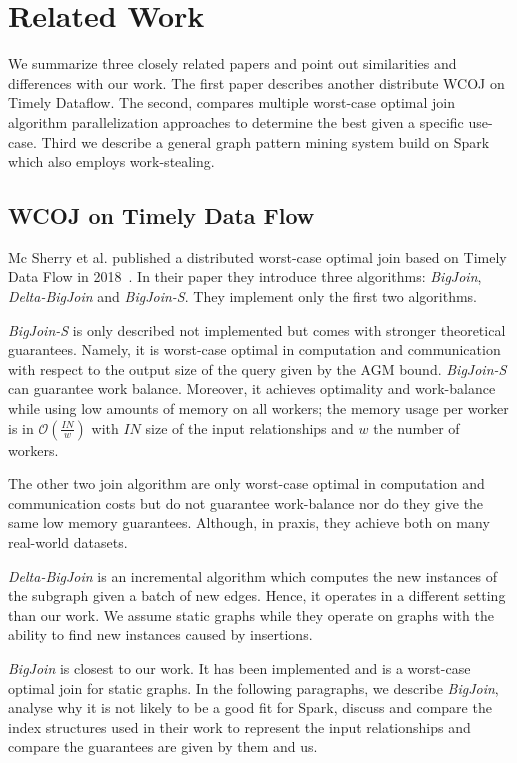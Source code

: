 \section{Related Work} \label{sec:related-work}
We summarize three closely related papers and point out similarities and differences with our
work.
The first paper describes another distribute \textsc{WCOJ} on Timely Dataflow.
The second, compares multiple worst-case optimal join algorithm parallelization
approaches to determine the best given a specific use-case.
Third we describe a general graph pattern mining system build on Spark which also
employs work-stealing.

\subsection{\textsc{WCOJ} on Timely Data Flow}\label{subsec:wcoj-timely-data-flow}

Mc Sherry et al. published a distributed worst-case optimal join based on Timely Data Flow in 2018~\cite{ammar2018distributed,naiad}.
In their paper they introduce three algorithms: \textit{BigJoin}, \textit{Delta-BigJoin} and \textit{BigJoin-S}.
They implement only the first two algorithms.

\textit{BigJoin-S} is only described not implemented but comes with stronger theoretical guarantees.
Namely, it is worst-case optimal in computation and communication with respect to the output size of the query
given by the AGM bound.
\textit{BigJoin-S} can guarantee work balance.
Moreover, it achieves optimality and work-balance while using low amounts of memory on all workers;
the memory usage per worker is in $\mathcal{O} (\frac{IN}{w})$ with $IN$ size of the input relationships and $w$ the number of workers.

The other two join algorithm are only worst-case optimal in computation and communication costs but
do not guarantee work-balance nor do they give the same low memory guarantees.
Although, in praxis, they achieve both on many real-world datasets.

\textit{Delta-BigJoin} is an incremental algorithm which computes the new instances of the subgraph given a batch of new edges.
Hence, it operates in a different setting than our work.
We assume static graphs while they operate on graphs with the ability to find new instances caused by insertions.

\textit{BigJoin} is closest to our work.
It has been implemented and is a worst-case optimal join for static graphs.
In the following paragraphs, we describe \textit{BigJoin}, analyse why it is not likely to be a good fit for Spark,
discuss and compare the index structures used in their work to represent the input relationships and compare the
guarantees are given by them and us.

